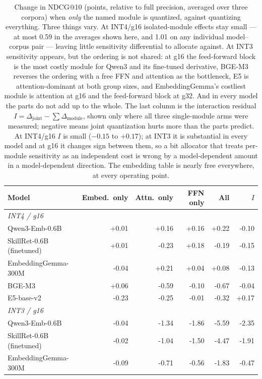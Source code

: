 \begin{table}[t]\centering\small
\caption{Change in NDCG@10 (points, relative to full precision, averaged over three
corpora) when \emph{only} the named module is quantized, against quantizing everything.
Three things vary. At INT4/g16 isolated-module effects stay small --- at most 0.59 in the
averages shown here, and 1.01 on any individual model--corpus pair --- leaving little
sensitivity differential to allocate against. At INT3 sensitivity appears, but the ordering
is not shared: at g16 the feed-forward block is the most costly module for Qwen3 and its
fine-tuned derivative, BGE-M3 reverses the ordering with a free FFN and attention as the
bottleneck, E5 is attention-dominant at both group sizes, and EmbeddingGemma's costliest
module is attention at g16 and the feed-forward block at g32. And in every model
the parts do not add up to the whole. The last column is the interaction residual
$I=\Delta_{\text{joint}}-\sum\Delta_{\text{module}}$, shown only where all three
single-module arms were measured; negative means joint quantization hurts more than the parts
predict. At INT4/g16 $I$ is small ($-0.15$ to $+0.17$); at INT3 it is substantial in every
model and at g16 it changes sign between them, so a bit allocator that
treats per-module sensitivity as an independent cost is wrong by a model-dependent amount in
a model-dependent direction. The
embedding table is nearly free everywhere, at every operating point.}
\label{tab:modules}
\begin{tabular}{lrrrrr}
\toprule
Model & Embed.\ only & Attn.\ only & FFN only & All & $I$ \\
\midrule
\multicolumn{6}{l}{\emph{INT4 / g16}} \\
\quad Qwen3-Emb-0.6B & +0.01 & +0.16 & +0.16 & +0.22 & -0.10 \\
\quad SkillRet-0.6B (finetuned) & +0.01 & -0.23 & +0.18 & -0.19 & -0.15 \\
\quad EmbeddingGemma-300M & -0.04 & +0.21 & +0.04 & +0.08 & -0.13 \\
\quad BGE-M3 & +0.06 & -0.59 & -0.10 & -0.67 & -0.04 \\
\quad E5-base-v2 & -0.23 & -0.25 & -0.01 & -0.32 & +0.17 \\
\multicolumn{6}{l}{\emph{INT3 / g16}} \\
\quad Qwen3-Emb-0.6B & -0.04 & -1.34 & -1.86 & -5.59 & -2.35 \\
\quad SkillRet-0.6B (finetuned) & -0.02 & -1.04 & -1.50 & -4.47 & -1.91 \\
\quad EmbeddingGemma-300M & -0.09 & -0.71 & -0.56 & -1.83 & -0.47 \\

\end{tabular}
\end{table}

